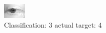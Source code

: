 \begin{figure}[h!]
\begin{center}
\includegraphics[width=0.60\columnwidth]{figures/ID2675_class_3_target_4.png}
\end{center}
\caption{ Classification: 3 actual target: 4}
\label{fig:ID2675_class_3_target_4}
\end{figure}

